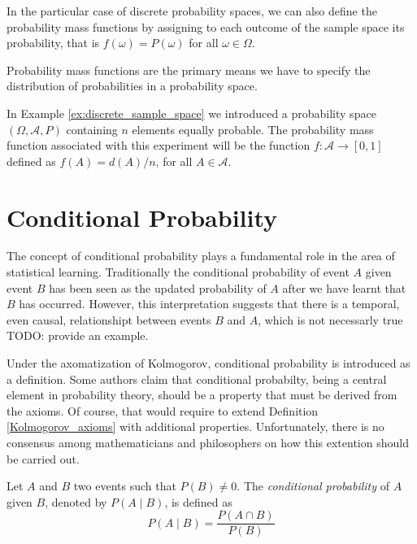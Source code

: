 In the particular case of discrete probability spaces, we can also define the probability mass functions by assigning to each outcome of the sample space its probability, that is $f \left( \omega \right) = P \left( \omega \right)$ for all $\omega \in \Omega$.

Probability mass functions are the primary means we have to specify the distribution of probabilities in a probability space.

\begin{example}
In Example \ref{ex:discrete_sample_space} we introduced a probability space $\left( \Omega, \mathcal{A}, P \right)$ containing $n$ elements equally probable. The probability mass function associated with this experiment will be the function $f : \mathcal{A} \rightarrow [0, 1]$ defined as $f \left( A \right) = d\left( A \right)/n$, for all $A \in \mathcal{A}$.
\end{example}


%
%

\section{Conditional Probability}
\label{sec:probability_conditional}

The concept of conditional probability plays a fundamental role in the area of statistical learning. Traditionally the conditional probability of event $A$ given event $B$ has been seen as the updated probability of $A$ after we have learnt that $B$ has occurred. However, this interpretation suggests that there is a temporal, even causal, relationshipt between events $B$ and $A$, which is not necessarly true {\color{red} TODO: provide an example}.

Under the axomatization of Kolmogorov, conditional probability is introduced as a definition. Some authors claim that conditional probabilty, being a central element in probability theory, should be a property that must be derived from the axioms. Of course, that would require to extend Definition \ref{Kolmogorov_axioms} with additional properties. Unfortunately, there is no consensus among mathematicians and philosophers on how this extention should be carried out.

\begin{definition}
Let $A$ and $B$ two events such that $P \left( B \right) \neq 0$. The \emph{conditional probability} of $A$ given $B$, denoted by $P \left( A \mid B \right)$, is defined as
\[
P\left(A\mid B\right) = \frac{P\left(A\cap B\right)}{P\left(B\right)}
\]
\end{definition}


